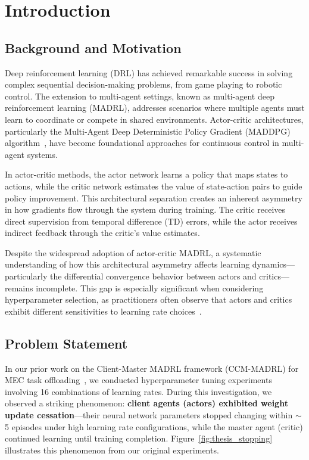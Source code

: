 \section{Introduction}
\label{sec:introduction}

\subsection{Background and Motivation}

Deep reinforcement learning (DRL) has achieved remarkable success in solving complex sequential decision-making problems, from game playing to robotic control. The extension to multi-agent settings, known as multi-agent deep reinforcement learning (MADRL), addresses scenarios where multiple agents must learn to coordinate or compete in shared environments. Actor-critic architectures, particularly the Multi-Agent Deep Deterministic Policy Gradient (MADDPG) algorithm~\cite{lowe2017multi}, have become foundational approaches for continuous control in multi-agent systems.

In actor-critic methods, the actor network learns a policy that maps states to actions, while the critic network estimates the value of state-action pairs to guide policy improvement. This architectural separation creates an inherent asymmetry in how gradients flow through the system during training. The critic receives direct supervision from temporal difference (TD) errors, while the actor receives indirect feedback through the critic's value estimates.

Despite the widespread adoption of actor-critic MADRL, a systematic understanding of how this architectural asymmetry affects learning dynamics---particularly the differential convergence behavior between actors and critics---remains incomplete. This gap is especially significant when considering hyperparameter selection, as practitioners often observe that actors and critics exhibit different sensitivities to learning rate choices~\cite{henderson2018deep}.

\subsection{Problem Statement}

In our prior work on the Client-Master MADRL framework (CCM-MADRL) for MEC task offloading~\cite{ccm_madrl, gebrekidan2024thesis}, we conducted hyperparameter tuning experiments involving 16 combinations of learning rates. During this investigation, we observed a striking phenomenon: \textbf{client agents (actors) exhibited weight update cessation}---their neural network parameters stopped changing within $\sim$5 episodes under high learning rate configurations, while the master agent (critic) continued learning until training completion. Figure~\ref{fig:thesis_stopping} illustrates this phenomenon from our original experiments.

